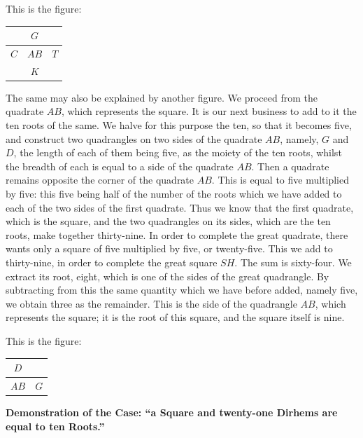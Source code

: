 This is the figure:
\begin{center}
\begin{tabular}{c|c|c}
\hline
  & $G$ & \\
\hline
$C$ & $AB$ & $T$ \\
\hline
  & $K$ & \\
\hline
\end{tabular}
\end{center}

The same may also be explained by another figure. We proceed from the quadrate $AB$, which represents the square. It is our next business to add to it the ten roots of the same. We halve for this purpose the ten, so that it becomes five, and construct two quadrangles on two sides of the quadrate $AB$, namely, $G$ and $D$, the length of each of them being five, as the moiety of the ten roots, whilst the breadth of each is equal to a side of the quadrate $AB$. Then a quadrate remains opposite the corner of the quadrate $AB$. This is equal to five multiplied by five: this five being half of the number of the roots which we have added to each of the two sides of the first quadrate. Thus we know that the first quadrate, which is the square, and the two quadrangles on its sides, which are the ten roots, make together thirty-nine. In order to complete the great quadrate, there wants only a square of five multiplied by five, or twenty-five. This we add to thirty-nine, in order to complete the great square $SH$. The sum is sixty-four. We extract its root, eight, which is one of the sides of the great quadrangle. By subtracting from this the same quantity which we have before added, namely five, we obtain three as the remainder. This is the side of the quadrangle $AB$, which represents the square; it is the root of this square, and the square itself is nine.

This is the figure:
\begin{center}
\begin{tabular}{c|c}
\hline
$D$ & \\
\hline
$AB$ & $G$ \\
\hline
\end{tabular}
\end{center}

\vspace{0.5cm}
\noindent\textbf{Demonstration of the Case: ``a Square and twenty-one Dirhems are equal to ten Roots.''}


